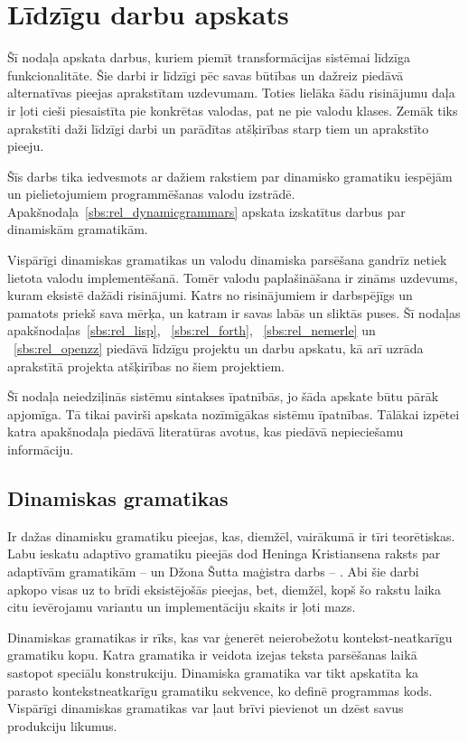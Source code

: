 \section{Līdzīgu darbu apskats}
\label{s:related}

Šī nodaļa apskata darbus, kuriem piemīt transformācijas sistēmai līdzīga funkcionalitāte. Šie darbi ir līdzīgi pēc savas būtības un dažreiz piedāvā alternatīvas pieejas aprakstītam uzdevumam. Toties lielāka šādu risinājumu daļa ir ļoti cieši piesaistīta pie konkrētas valodas, pat ne pie valodu klases. Zemāk tiks aprakstīti daži līdzīgi darbi un parādītas atšķirības starp tiem un aprakstīto pieeju.

Šīs darbs tika iedvesmots ar dažiem rakstiem par dinamisko gramatiku iespējām un pielietojumiem programmēšanas valodu izstrādē. Apakšnodaļa~\ref{sbs:rel_dynamicgrammars} apskata izskatītus darbus par dinamiskām gramatikām.

Vispārīgi dinamiskas gramatikas un valodu dinamiska parsēšana gandrīz netiek lietota valodu implementēšanā. Tomēr valodu paplašināšana ir zināms uzdevums, kuram eksistē dažādi risinājumi. Katrs no risinājumiem ir darbspējīgs un pamatots priekš sava mērķa, un katram ir savas labās un sliktās puses. Šī nodaļas apakšnodaļas~\ref{sbs:rel_lisp}, ~\ref{sbs:rel_forth}, ~\ref{sbs:rel_nemerle} un ~\ref{sbs:rel_openzz} piedāvā līdzīgu projektu un darbu apskatu, kā arī uzrāda aprakstītā projekta atšķirības no šiem projektiem.

Šī nodaļa neiedziļinās sistēmu sintakses īpatnībās, jo šāda apskate būtu pārāk apjomīga. Tā tikai pavirši apskata nozīmīgākas sistēmu īpatnības. Tālākai izpētei katra apakšnodaļa piedāvā literatūras avotus, kas piedāvā nepieciešamu informāciju.

\subsection{\label{sbs:rel_dynamicgrammars}Dinamiskas gramatikas}

Ir dažas dinamisku gramatiku pieejas, kas, diemžēl, vairākumā ir tīri teorētiskas. Labu ieskatu adaptīvo gramatiku pieejās dod Heninga Kristiansena raksts par adaptīvām gramatikām --\cite{Christiansen:SurveyAdaptableGrammars} un Džona Šutta maģistra darbs -- \cite{Shutt:AdaptiveGrammars}. Abi šie darbi apkopo visas uz to brīdi eksistējošās pieejas, bet, diemžēl, kopš šo rakstu laika citu ievērojamu variantu un implementāciju skaits ir ļoti mazs.

Dinamiskas gramatikas ir rīks, kas var ģenerēt neierobežotu kontekst-neatkarīgu gramatiku kopu. Katra gramatika ir veidota izejas teksta parsēšanas laikā sastopot speciālu konstrukciju. Dinamiska gramatika var tikt apskatīta ka parasto kontekstneatkarīgu gramatiku sekvence, ko definē programmas kods. Vispārīgi dinamiskas gramatikas var ļaut brīvi pievienot un dzēst savus produkciju likumus.

